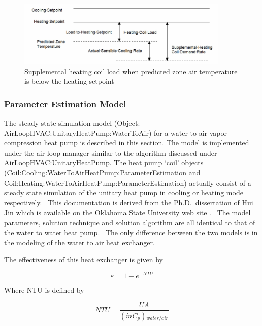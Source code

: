 \begin{figure}[hbtp] %
\centering
\includegraphics[width=0.9\textwidth, height=0.9\textheight, keepaspectratio=true]{media/image5263.png}
\caption{Supplemental heating coil load when predicted zone air temperature is below the heating setpoint \protect \label{fig:supplemental-heating-coil-load-when-predicted-005}}
\end{figure}

\subsubsection{Parameter Estimation Model}\label{parameter-estimation-model}

The steady state simulation model (Object: AirLoopHVAC:UnitaryHeatPump:WaterToAir) for a water-to-air vapor compression heat pump is described in this section. The model is implemented under the air-loop manager similar to the algorithm discussed under AirLoopHVAC:UnitaryHeatPump. The heat pump `coil' objects (Coil:Cooling:WaterToAirHeatPump:ParameterEstimation and Coil:Heating:WaterToAirHeatPump:ParameterEstimation) actually consist of a steady state simulation of the unitary heat pump in cooling or heating mode respectively.~ This documentation is derived from the Ph.D.~dissertation of Hui Jin which is available on the Oklahoma State University web site . ~The model parameters, solution technique and solution algorithm are all identical to that of the water to water heat pump.~ The only difference between the two models is in the modeling of the water to air heat exchanger.

The effectiveness of this heat exchanger is given by

\begin{equation}
\varepsilon  = 1 - {e^{ - NTU}}
\end{equation}

Where NTU is defined by

\begin{equation}
NTU = \frac{{UA}}{{(\dot mC{}_p){}_{water/air}}}
\end{equation}

